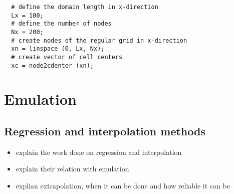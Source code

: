 \begin{lstlisting}
  # define the domain length in x-direction
  Lx = 100;
  # define the number of nodes
  Nx = 200;
  # create nodes of the regular grid in x-direction
  xn = linspace (0, Lx, Nx);
  # create vector of cell centers
  xc = node2cdenter (xn);
\end{lstlisting}



\section{Emulation}


\subsection{Regression and interpolation methods}

\begin{itemize}
\itemsep0em
  \item explain the work done on regression and interpolation
  \item explain their relation with emulation
  \item explian extrapolation, when it can be done and how reliable it can be
\end{itemize}


